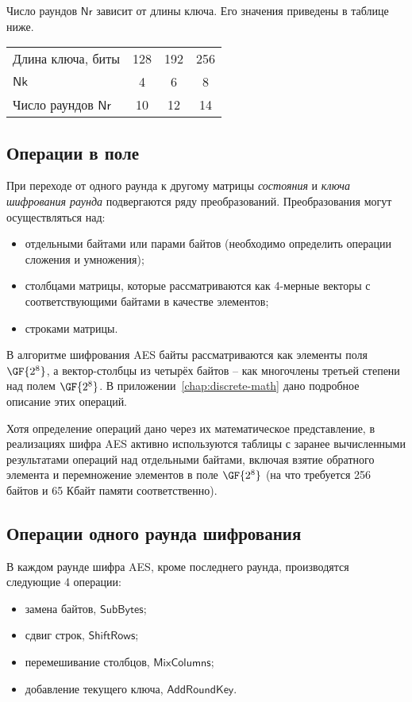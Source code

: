 Число раундов $\mathsf{Nr}$ зависит от длины ключа. Его значения приведены в таблице ниже.

\begin{center}
    \begin{tabular}{|l|c|c|c|}
    \hline
    Длина ключа, биты           &128 & 192 & 256 \\
    $\mathsf{Nk}$               & 4  & 6   & 8 \\
    Число раундов $\mathsf{Nr}$ & 10 & 12 & 14 \\
    \hline
    \end{tabular}
\end{center}


\subsection{Операции в поле}

При переходе от одного раунда к другому матрицы \emph{состояния} и \emph{ключа шифрования раунда} подвергаются ряду преобразований. Преобразования могут осуществляться над:
\begin{itemize}
    \item отдельными байтами или парами байтов (необходимо определить операции сложения и умножения);
    \item столбцами матрицы, которые рассматриваются как 4-мерные векторы с соответствующими байтами в качестве элементов;
    \item строками матрицы.
\end{itemize}

В алгоритме шифрования AES байты рассматриваются как элементы поля $\GF{2^8}$, а вектор-столбцы из четырёх байтов -- как многочлены третьей степени над полем $\GF{2^8}$. В приложении~\ref{chap:discrete-math} дано подробное описание этих операций.

Хотя определение операций дано через их математическое представление, в реализациях шифра AES активно используются таблицы с заранее вычисленными результатами операций над отдельными байтами, включая взятие обратного элемента и перемножение элементов в поле $\GF{2^8}$ (на что требуется 256 байтов и 65 Кбайт памяти соответственно).

\subsection{Операции одного раунда шифрования}

В каждом раунде шифра AES, кроме последнего раунда, производятся следующие 4 операции:
\begin{itemize}
  \item замена байтов, $\mathsf{SubBytes}$;
  \item сдвиг строк, $\mathsf{ShiftRows}$;
  \item перемешивание столбцов, $\mathsf{MixColumns}$;
  \item добавление текущего ключа, $\mathsf{AddRoundKey}$.
\end{itemize}

